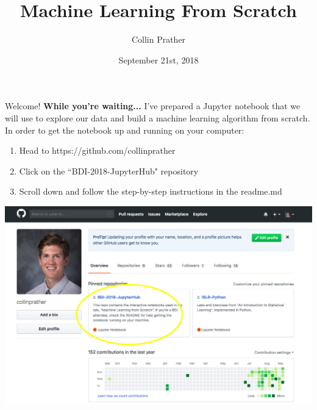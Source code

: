 \documentclass[notes]{beamer}
\title{Machine Learning From Scratch}
\author{Collin Prather}
\date{September 21st, 2018}
\begin{document}
\begin{frame}{Welcome!}
\textbf{While you're waiting...}
I've prepared a Jupyter notebook that we will use to explore our data and build a machine learning algorithm from scratch. In order to get the notebook up and running on your computer:\\
\begin{multicols}{2}
	\begin{enumerate}
		\item[1.)] Head to https://github.com/collinprather
		\item[2.)] Click on the ``BDI-2018-JupyterHub" repository
		\item[3.)] Scroll down and follow the step-by-step instructions in the readme.md
	\end{enumerate}
	\columnbreak
	\begin{flushright}
		\includegraphics[scale=.122]{Figures/github_profile}
	\end{flushright}
\end{multicols}
\end{frame}
	
\frame{\titlepage}
\end{document}
